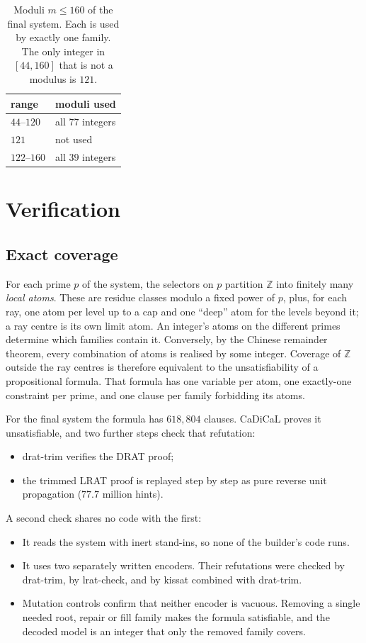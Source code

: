 \documentclass[11pt]{amsart}
\theoremstyle{definition}
\theoremstyle{remark}
\newcommand{\Z}{\mathbb{Z}}
\begin{document}
\begin{table}[ht]
\centering
\caption{Moduli $m\le160$ of the final system. Each is used by exactly one family. The only integer in $[44,160]$
that is not a modulus is $121$.}\label{tab:ladder}
\begin{tabular}{@{}ll@{}}
\toprule
range & moduli used\\
\midrule
$44$–$120$ & all $77$ integers\\
$121$ & not used\\
$122$–$160$ & all $39$ integers\\
\bottomrule
\end{tabular}
\end{table}

\section{Verification}\label{sec:verify}

\subsection*{Exact coverage}
For each prime $p$ of the system, the selectors on $p$ partition $\Z$ into finitely many \emph{local atoms}. These
are residue classes modulo a fixed power of $p$, plus, for each ray, one atom per level up to a cap and one
``deep'' atom for the levels beyond it; a ray centre is its own limit atom. An integer's atoms on the different
primes determine which families contain it. Conversely, by the Chinese remainder theorem, every combination of atoms
is realised by some integer. Coverage of $\Z$ outside the ray centres is therefore equivalent to the
unsatisfiability of a propositional formula. That formula has one variable per atom, one exactly-one constraint per
prime, and one clause per family forbidding its atoms.

For the final system the formula has $618{,}804$ clauses. CaDiCaL \cite{CaDiCaL} proves it unsatisfiable, and two
further steps check that refutation:
\begin{itemize}
\item drat-trim \cite{DRATtrim} verifies the DRAT proof;
\item the trimmed LRAT proof is replayed step by step as pure reverse unit propagation ($77.7$ million hints).
\end{itemize}

A second check shares no code with the first:
\begin{itemize}
\item It reads the system with inert stand-ins, so none of the builder's code runs.
\item It uses two separately written encoders. Their refutations were checked by drat-trim, by lrat-check, and by
  kissat \cite{Kissat} combined with drat-trim.
\item Mutation controls confirm that neither encoder is vacuous. Removing a single needed root, repair or fill family
  makes the formula satisfiable, and the decoded model is an integer that only the removed family covers.
\end{itemize}
\end{document}
